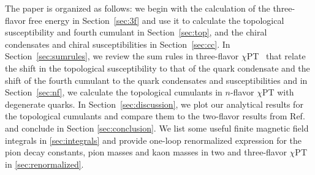 \documentclass[12pt]{elsarticle}
\begin{document}
The paper is organized as follows: we begin with the calculation of the three-flavor free energy in Section~\ref{sec:3f} and use it to calculate the topological susceptibility and fourth cumulant in Section~\ref{sec:top}, and the chiral condensates and chiral susceptibilities in Section~\ref{sec:cc}. In Section~\ref{sec:sumrules}, we review the sum rules in three-flavor $\chi$PT~\cite{Adhikari:2021lbl} that relate the shift in the topological susceptibility to that of the quark condensate and the shift of the fourth cumulant to the quark condensates and susceptibilities and in Section~\ref{sec:nf}, we calculate the topological cumulants in $n$-flavor $\chi$PT with degenerate quarks. In Section~\ref{sec:discussion}, we plot our analytical results for the topological cumulants and compare them to the two-flavor results from Ref.~\cite{Adhikari:2021xra} and conclude in Section \ref{sec:conclusion}. We list some useful finite magnetic field integrals in \ref{sec:integrals} and provide one-loop renormalized expression for the pion decay constants, pion masses and kaon masses in two and three-flavor $\chi$PT in \ref{sec:renormalized}. 
\end{document}
